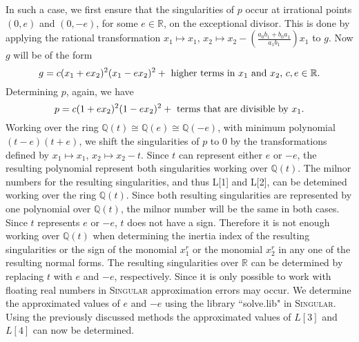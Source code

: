 \documentclass{amsproc}
\begin{document}
In such a case, we first ensure that the singularities of $p$ occur at irrational points $(0,e)$ and $(0,-e)$, for some $e\in\mathbb R$, on the exceptional divisor. This is done by applying the rational transformation $x_1\mapsto x_1$, $x_2\mapsto x_2-(\frac{a_0b_1+b_0a_1}{a_1b_1})x_1$ to $g$. Now $g$ will be of the form
\[g=c(x_1+ex_2)^2(x_1-ex_2)^2+\textnormal{ higher terms in $x_1$ and $x_2$, $c,e\in\mathbb R$}.\]
Determining $p$, again, we have
\[p=c(1+ex_2)^2(1-ex_2)^2+\textnormal{ terms that are divisible by $x_1$.}\]
 Working over the ring $\mathbb Q(t)\cong \mathbb Q(e)\cong \mathbb Q (-e)$, with minimum polynomial $(t-e)(t+e)$, we shift the singularities of $p$ to $0$ by the transformations defined by $x_1\mapsto x_1$, $x_2\mapsto x_2-t$. Since $t$ can represent either $e$ or $-e$, the resulting polynomial represent both singularities working over $\mathbb Q(t)$. The milnor numbers for the resulting singularities, and thus L[1] and L[2], can be detemined working over the ring $\mathbb Q(t)$. Since both resulting singularities are represented by one polynomial over $\mathbb Q(t)$, the milnor number will be the same in both cases. Since $t$ represents $e$ or $-e$, $t$ does not have a sign. Therefore it is not enough working over $\mathbb Q(t)$ when determining the inertia index of the resulting singularities or the sign of the monomial $x_1^r$ or the monomial $x_2^r$ in  any one of the resulting normal forms. The resulting singularities over $\mathbb R$ can be determined by replacing $t$ with $e$ and $-e$, respectively. Since it is only possible to work with floating real numbers in \textsc{Singular} approximation errors may occur. We determine the approximated values of $e$ and $-e$ using the library ``solve.lib" \cite{solve.lib} in \textsc{Singular}. Using the previously discussed methods the approximated values of $L[3]$ and $L[4]$ can now be determined.
\end{document}
